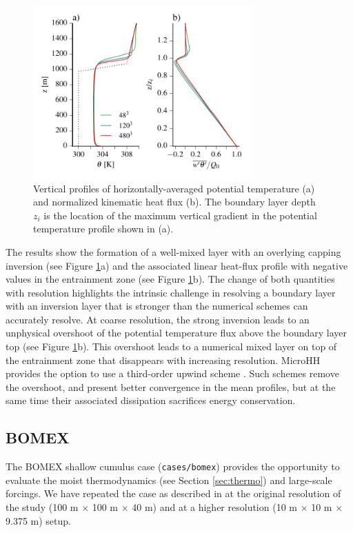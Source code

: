 \documentclass[gmd]{copernicus}
\begin{document}
\begin{figure}[t]
	\vspace*{2mm}
	\begin{center}
		\includegraphics[width=8.3cm]{figs/sullivan2011.pdf}
	\end{center}
	\caption{Vertical profiles of horizontally-averaged potential temperature (a) and normalized kinematic heat flux (b). The boundary layer depth $z_i$ is the location of the maximum vertical gradient in the potential temperature profile shown in (a). }
	\label{fig:sullivan2011}
\end{figure}

The results show the formation of a well-mixed layer with an overlying capping inversion (see Figure \ref{fig:sullivan2011}a) and the associated linear heat-flux profile with negative values in the entrainment zone (see Figure \ref{fig:sullivan2011}b). The change of both quantities with resolution highlights the intrinsic challenge in resolving a boundary layer with an inversion layer that is stronger than the numerical schemes can accurately resolve. At coarse resolution, the strong inversion leads to an unphysical overshoot of the potential temperature flux above the boundary layer top (see Figure \ref{fig:sullivan2011}b). This overshoot leads to a numerical mixed layer on top of the entrainment zone  that disappears with increasing resolution. MicroHH provides the option to use a third-order upwind scheme \citep{Wicker2002}. Such schemes remove the overshoot, and present better convergence in the mean profiles, but at the same time their associated dissipation sacrifices energy conservation.

\subsection{BOMEX}\label{sec:bomex}
The BOMEX shallow cumulus case \citep{Siebesma2003} (\texttt{cases/bomex}) provides the opportunity to evaluate the moist thermodynamics (see Section \ref{sec:thermo}) and large-scale forcings. We have repeated the case as described in \citet{Siebesma2003} at the original resolution of the study (100 m $\times$ 100 m $\times$ 40 m) and at a higher resolution (10 m $\times$ 10 m $\times$ 9.375 m) setup.
\end{document}
